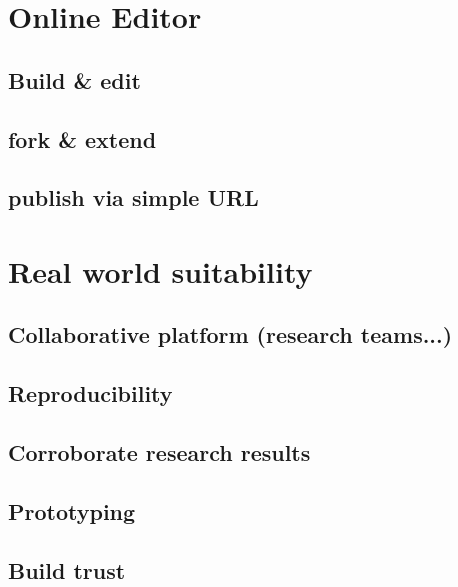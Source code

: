\section{Online Editor}
\label{sect:online_editor}

	\subsection{Build \& edit}
	\label{ssect: build_edit}
	
	\subsection{fork \& extend}
	\label{ssect: fork_extend}
	
	\subsection{publish via simple URL}
	\label{ssect: publish_url}



\section{Real world suitability}
\label{sect:realworld_suitability}

	\subsection{Collaborative platform (research teams...)}
	\label{ssect:collaborative_platform}

	\subsection{Reproducibility}
	\label{ssect:reproducibility}

	\subsection{Corroborate research results}
	\label{ssect: corroborate_results}
		
	\subsection{Prototyping}
	\label{ssect: prototyping}
	
	\subsection{Build trust}
	\label{ssect: build_trust}



